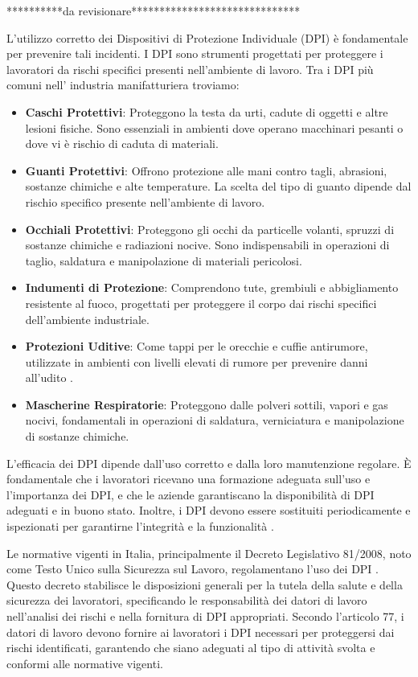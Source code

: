 **********da revisionare******************************


\noindent L'utilizzo corretto dei Dispositivi di Protezione Individuale (DPI) è fondamentale per prevenire tali incidenti. I DPI sono strumenti progettati per proteggere i lavoratori da rischi specifici presenti nell'ambiente di lavoro. Tra i DPI più comuni nell' industria manifatturiera troviamo:

\begin{itemize}
    \item \textbf{Caschi Protettivi}: Proteggono la testa da urti, cadute di oggetti e altre lesioni fisiche. Sono essenziali in ambienti dove operano macchinari pesanti o dove vi è rischio di caduta di materiali.
    \item \textbf{Guanti Protettivi}: Offrono protezione alle mani contro tagli, abrasioni, sostanze chimiche e alte temperature. La scelta del tipo di guanto dipende dal rischio specifico presente nell'ambiente di lavoro.
    \item \textbf{Occhiali Protettivi}: Proteggono gli occhi da particelle volanti, spruzzi di sostanze chimiche e radiazioni nocive. Sono indispensabili in operazioni di taglio, saldatura e manipolazione di materiali pericolosi.
    \item \textbf{Indumenti di Protezione}: Comprendono tute, grembiuli e abbigliamento resistente al fuoco, progettati per proteggere il corpo dai rischi specifici dell'ambiente industriale.
    \item \textbf{Protezioni Uditive}: Come tappi per le orecchie e cuffie antirumore, utilizzate in ambienti con livelli elevati di rumore per prevenire danni all'udito \cite{dpisicurezza}.
    \item \textbf{Mascherine Respiratorie}: Proteggono dalle polveri sottili, vapori e gas nocivi, fondamentali in operazioni di saldatura, verniciatura e manipolazione di sostanze chimiche.
\end{itemize}

L'efficacia dei DPI dipende dall'uso corretto e dalla loro manutenzione regolare. È fondamentale che i lavoratori ricevano una formazione adeguata sull'uso e l'importanza dei DPI, e che le aziende garantiscano la disponibilità di DPI adeguati e in buono stato. Inoltre, i DPI devono essere sostituiti periodicamente e ispezionati per garantirne l’integrità e la funzionalità \cite{dpisicurezza}.

Le normative vigenti in Italia, principalmente il Decreto Legislativo 81/2008, noto come Testo Unico sulla Sicurezza sul Lavoro, regolamentano l'uso dei DPI \cite{decreto81}. Questo decreto stabilisce le disposizioni generali per la tutela della salute e della sicurezza dei lavoratori, specificando le responsabilità dei datori di lavoro nell'analisi dei rischi e nella fornitura di DPI appropriati. Secondo l'articolo 77, i datori di lavoro devono fornire ai lavoratori i DPI necessari per proteggersi dai rischi identificati, garantendo che siano adeguati al tipo di attività svolta e conformi alle normative vigenti.

